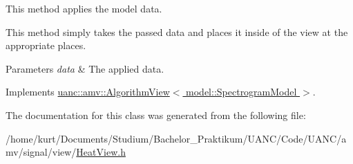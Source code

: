This method applies the model data. 

This method simply takes the passed data and places it inside of the view at the appropriate places.


\begin{DoxyParams}{Parameters}
{\em data} & The applied data. \\
\hline
\end{DoxyParams}


Implements \hyperlink{classuanc_1_1amv_1_1_algorithm_view_ad656cf5223a66a942441ee39f44f65a3}{uanc\+::amv\+::\+Algorithm\+View$<$ model\+::\+Spectrogram\+Model $>$}.



The documentation for this class was generated from the following file\+:\begin{DoxyCompactItemize}
\item 
/home/kurt/\+Documents/\+Studium/\+Bachelor\+\_\+\+Praktikum/\+U\+A\+N\+C/\+Code/\+U\+A\+N\+C/amv/signal/view/\hyperlink{_heat_view_8h}{Heat\+View.\+h}\end{DoxyCompactItemize}
